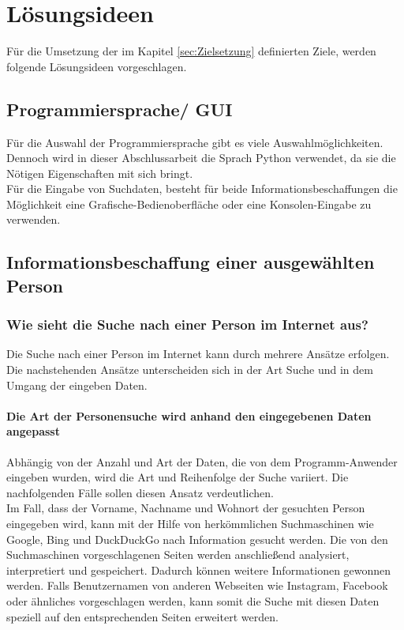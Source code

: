 
\chapter{Lösungsideen}  %
\label{cha:Lösungsideen} %
Für die Umsetzung der im Kapitel \ref{sec:Zielsetzung} definierten Ziele, werden folgende Lösungsideen vorgeschlagen.

\section{Programmiersprache/ GUI}
Für die Auswahl der Programmiersprache gibt es viele Auswahlmöglichkeiten. Dennoch wird in dieser Abschlussarbeit die Sprach Python verwendet, da sie die Nötigen Eigenschaften mit sich bringt.\\
Für die Eingabe von Suchdaten, besteht für beide Informationsbeschaffungen die Möglichkeit eine Grafische-Bedienoberfläche oder eine Konsolen-Eingabe zu verwenden.
\section{Informationsbeschaffung einer ausgewählten Person}	
	\subsection{Wie sieht die Suche nach einer Person im Internet aus?}
	\label{sec:Suche nach Information}
	Die Suche nach einer Person im Internet kann durch mehrere Ansätze erfolgen. Die nachstehenden Ansätze unterscheiden sich in der Art Suche und in dem Umgang der eingeben Daten.
		\subsubsection{Die Art der Personensuche wird anhand den eingegebenen Daten angepasst}
		\label{subsubsec: DieArtderPersonensuchewirdanhanddeneingegebenenDaten angepasst}
		Abhängig von der Anzahl und Art der Daten, die von dem Programm-Anwender eingeben wurden, wird die Art und Reihenfolge der Suche variiert. Die nachfolgenden Fälle sollen diesen Ansatz verdeutlichen.\\
		
		Im Fall, dass der Vorname, Nachname und Wohnort der gesuchten Person eingegeben wird, kann mit der Hilfe von herkömmlichen Suchmaschinen wie Google, Bing und DuckDuckGo nach Information gesucht werden. Die von den Suchmaschinen vorgeschlagenen Seiten werden anschließend analysiert, interpretiert und gespeichert. Dadurch können weitere Informationen gewonnen werden. Falls Benutzernamen von anderen Webseiten wie Instagram, Facebook oder ähnliches vorgeschlagen werden, kann somit die Suche mit diesen Daten speziell auf den entsprechenden Seiten erweitert werden.\\
		
